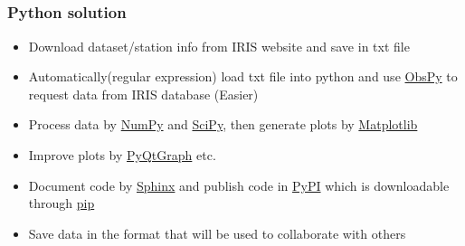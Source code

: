\documentclass[compress]{beamer}
\begin{document}
\begin{frame}
	\frametitle{Python\textsuperscript{\texttrademark} solution}
	\begin{itemize}
		\item Download dataset/station info from IRIS website and save in txt file
		\item Automatically(regular expression) load txt file into python and use \href{https://github.com/obspy/obspy/wiki}{ObsPy} to request data from IRIS database (Easier)
		\item Process data by \href{http://www.numpy.org/}{NumPy} and \href{http://scipy.org/}{SciPy}, then generate plots by \href{http://matplotlib.org/}{Matplotlib}
		\item Improve plots by \href{http://www.pyqtgraph.org/}{PyQtGraph} etc.
		\item Document code by \href{http://www.sphinx-doc.org/en/stable/}{Sphinx} and publish code in \href{https://pypi.python.org/pypi}{PyPI} which is downloadable through \href{https://pip.pypa.io/en/stable/}{pip}
		\item Save data in the format that will be used to collaborate with others
	\end{itemize}
\end{frame}
\end{document}

